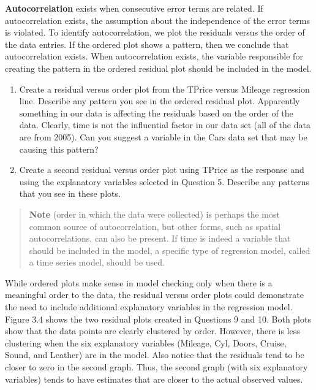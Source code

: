 \documentclass[
]{report}
\begin{document}
\textbf{Autocorrelation} exists when consecutive error terms are related. If autocorrelation exists, the assumption about the independence of the error terms is violated. To identify autocorrelation, we plot the residuals versus the order of the data entries. If the ordered plot shows a pattern, then we conclude that autocorrelation exists. When autocorrelation exists, the variable responsible for creating the pattern in the ordered residual plot should be included in the model.

\begin{enumerate}
\def\labelenumi{\arabic{enumi}.}
\setcounter{enumi}{8}
\item
  Create a residual versus order plot from the TPrice versus Mileage regression line. Describe any pattern you see in the ordered residual plot. Apparently something in our data is affecting the residuals based on the order of the data. Clearly, time is not the influential factor in our data set (all of the data are from 2005). Can you suggest a variable in the Cars data set that may be causing this pattern?
\item
  Create a second residual versus order plot using TPrice as the response and using the explanatory variables selected in Question 5. Describe any patterns that you see in these plots.
\end{enumerate}

\begin{quote}
\textbf{Note} (order in which the data were collected) is perhaps the most common source of autocorrelation, but other forms, such as spatial autocorrelations, can also be present. If time is indeed a variable that should be included in the model, a specific type of regression model, called a time series model, should be used.
\end{quote}

While ordered plots make sense in model checking only when there is a meaningful order to the data, the residual versus order plots could demonstrate the need to include additional explanatory variables in the regression model. Figure 3.4 shows the two residual plots created in Questions 9 and 10. Both plots show that the data points are clearly clustered by order. However, there is less clustering when the six explanatory variables (Mileage, Cyl, Doors, Cruise, Sound, and Leather) are in the model. Also notice that the residuals tend to be closer to zero in the second graph. Thus, the second graph (with six explanatory variables) tends to have estimates that are closer to the actual observed values.
\end{document}
